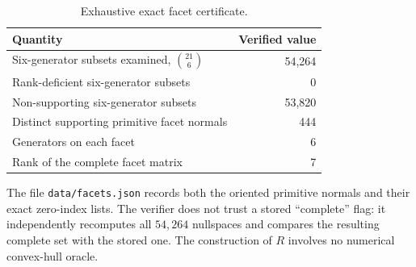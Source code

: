 \documentclass[11pt]{article}
\theoremstyle{definition}
\numberwithin{equation}{section}
\begin{document}
\begin{table}[ht]
\centering
\caption{Exhaustive exact facet certificate.}\label{tab:facets}
\begin{tabular}{lr}
\toprule
Quantity & Verified value\\
\midrule
Six-generator subsets examined, $\binom{21}{6}$ & 54,264\\
Rank-deficient six-generator subsets & 0\\
Non-supporting six-generator subsets & 53,820\\
Distinct supporting primitive facet normals & 444\\
Generators on each facet & 6\\
Rank of the complete facet matrix & 7\\
\bottomrule
\end{tabular}
\end{table}

The file \texttt{data/facets.json} records both the oriented primitive
normals and their exact zero-index lists. The verifier does not trust a
stored ``complete'' flag: it independently recomputes all $54,264$
nullspaces and compares the resulting complete set with the stored one.
The construction of $R$ involves no numerical convex-hull oracle.
\end{document}
